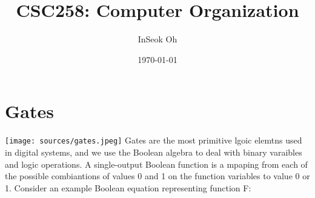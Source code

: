 \documentclass[12pt]{article}
\title{CSC258: Computer Organization}
\date{\today}
\author{InSeok Oh}
\theoremstyle{definition}
\begin{document}
\theoremstyle{definition}
\maketitle
\doclicenseThis
\tableofcontents
\newpage

\section{Gates}
    \texttt{[image: sources/gates.jpeg]}
Gates are the most primitive lgoic elemtns used in digital systems, and we use the Boolean algebra to deal with binary varaibles and logic operations.
A single-output Boolean function is a mpaping from each of the possible combiantions of values 0 and 1 on the function variables to value 0 or 1.
Consider an example Boolean equation representing function F:
\end{document}
